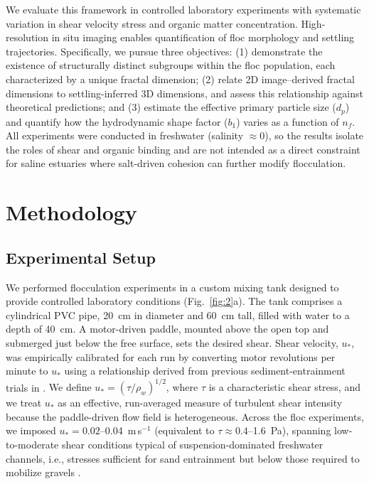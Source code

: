 \documentclass{agujournal2019}
\providecommand{\DIFadd}[1]{{\protect\color{blue}#1}}
\begin{document}
We evaluate this framework in controlled laboratory experiments with systematic variation in shear velocity stress and organic matter concentration. High-resolution in situ imaging enables quantification of floc morphology and settling trajectories. Specifically, we pursue three objectives: (1) demonstrate the existence of structurally distinct subgroups within the floc population, each characterized by a unique fractal dimension; (2) relate 2D image–derived fractal dimensions to settling-inferred 3D dimensions, and assess this relationship against theoretical predictions; and (3) estimate the effective primary particle size ($d_p$) and quantify how the hydrodynamic shape factor ($b_1$) varies as a function of $n_f$. \DIFadd{ All experiments were conducted in freshwater (salinity $\approx 0$), so the results isolate the roles of shear and organic binding and are not intended as a direct constraint for saline estuaries where salt-driven cohesion can further modify flocculation.} 

\section{Methodology}

\subsection{Experimental Setup}

We performed flocculation experiments in a custom mixing tank designed to provide controlled laboratory conditions (Fig.~\ref{fig:2}a). The tank comprises a cylindrical PVC pipe, 20~cm in diameter and 60~cm tall, filled with water to a depth of 40~cm. A motor-driven paddle, mounted above the open top and submerged just below the free surface, sets the desired shear. Shear velocity, $u_\ast$, was empirically calibrated for each run by converting motor revolutions per minute to $u_\ast$ using a relationship derived from previous sediment-entrainment trials in . \DIFadd{ We define $u_\ast=(\tau/\rho_w)^{1/2}$, where $\tau$ is a characteristic shear stress, and we treat $u_\ast$ as an effective, run-averaged measure of turbulent shear intensity because the paddle-driven flow field is heterogeneous. Across the floc experiments, we imposed $u_\ast=0.02$--0.04~m\,s$^{-1}$ (equivalent to $\tau\approx0.4$--1.6~Pa), spanning low-to-moderate shear conditions typical of suspension-dominated freshwater channels, i.e., stresses sufficient for sand entrainment but below those required to mobilize gravels \cite{julien2018river}.}
\end{document}
